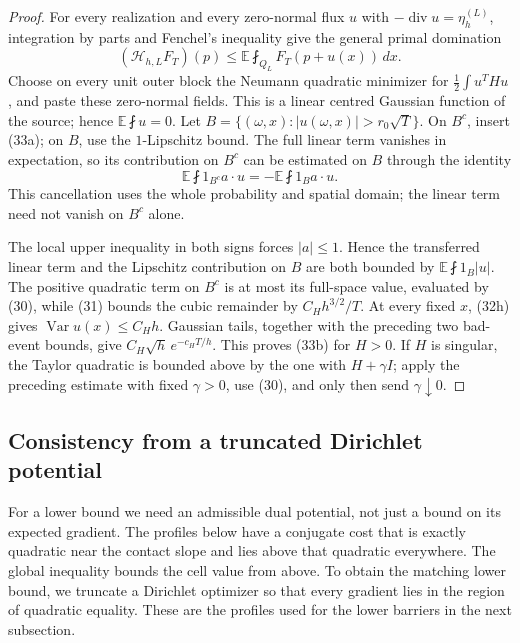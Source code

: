 \documentclass{aomart}
\theoremstyle{definition}
\newcommand{\1}{\mathbf 1}
\begin{document}
\begin{proof}
For every realization and every zero-normal flux $u$ with
$-\operatorname {div}u=\eta_ h^{(L)}$, integration by parts and
Fenchel's inequality give the general primal domination
\begin{equation}
(\mathcal H_ {h,L}F_ T)(p)
\leq\mathbb E\fint_ {Q_ L}F_ T(p+u(x))\,dx.
\tag{33c}
\end{equation}
Choose on every unit outer block the Neumann quadratic minimizer for
$\frac12\int u^THu$, and paste these zero-normal fields.  This is a
linear centred Gaussian function of the source; hence
$\mathbb E\fint u=0$.  Let
$B=\{(\omega,x):|u(\omega,x)|>r_ 0\sqrt T\}$.  On $B^c$, insert
(33a); on $B$, use the $1$-Lipschitz bound.  The full linear term
vanishes in expectation, so its contribution on $B^c$ can be estimated
on $B$ through the identity
\begin{equation*}
\mathbb E\fint 1_ {B^c}a\cdot u
=-\mathbb E\fint1_ Ba\cdot u.
\end{equation*}
This cancellation uses the whole probability and spatial domain; the
linear term need not vanish on $B^c$ alone.

The local upper inequality in both signs forces $|a|\leq1$.
Hence the transferred linear term and the Lipschitz contribution on
$B$ are both bounded by $\mathbb E\fint1_ B|u|$.  The positive
quadratic term on $B^c$ is at most its full-space value, evaluated by
(30), while (31) bounds the cubic remainder by $C_ Hh^{3/2}/T$.
At every fixed $x$, (32h) gives
$\operatorname {Var}u(x)\leq C_ Hh$.  Gaussian tails, together with
the preceding two bad-event bounds, give
$C_ H\sqrt h\,e^{-c_ HT/h}$.  This proves (33b) for $H>0$.  If $H$ is singular,
the Taylor quadratic is bounded above by the one with $H+\gamma I$;
apply the preceding estimate with fixed $\gamma>0$, use (30), and only
then send $\gamma\downarrow0$.

\end{proof}

\subsection{Consistency from a truncated Dirichlet potential}

For a lower bound we need an admissible dual potential, not just a
bound on its expected gradient.  The profiles below have a conjugate
cost that is exactly quadratic near the contact slope and lies above
that quadratic everywhere.  The global inequality bounds the cell
value from above.  To obtain the matching lower bound, we truncate a
Dirichlet optimizer so that every gradient lies in the region of
quadratic equality.  These are the profiles used for the lower
barriers in the next subsection.
\end{document}
